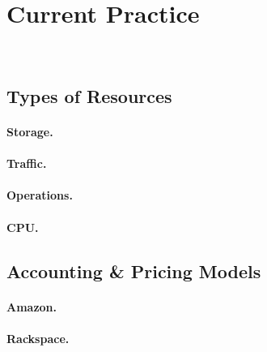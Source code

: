 \section{Current Practice} \label{sect:current-practice}

~\cite{MMS13}

\subsection{Types of Resources}

\paragraph{Storage.}

\paragraph{Traffic.}

\paragraph{Operations.}

\paragraph{CPU.}

\subsection{Accounting \& Pricing Models}

\paragraph{Amazon.}

\paragraph{Rackspace.}
